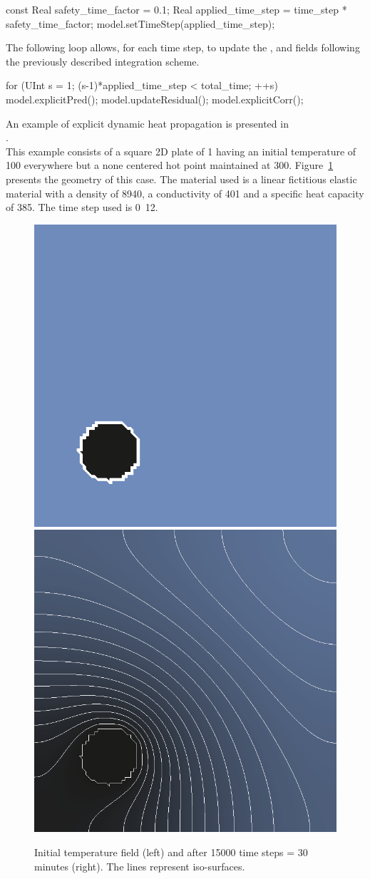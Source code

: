 \begin{cpp}
  const Real safety_time_factor = 0.1;
  Real applied_time_step = time_step * safety_time_factor;
  model.setTimeStep(applied_time_step);
\end{cpp}

The following loop  allows, for each time  step, to update the  ,  and
  fields  following the previously described integration scheme.

\begin{cpp}
  for (UInt s = 1; (s-1)*applied_time_step < total_time; ++s) {
    model.explicitPred();
    model.updateResidual();
    model.explicitCorr();
  }
\end{cpp}

An    example    of    explicit     dynamic    heat propagation is    presented    in \\
.  \\
This example consists of a square 2D plate of \unit{1}{\squaremetre}
having an initial temperature of \unit{100}{\kelvin} everywhere but a
none centered hot point maintained at
\unit{300}{\kelvin}. Figure~\ref{fig:htm:explicit:dynamic} presents
the geometry of this case. The material used is a linear fictitious
elastic material with a density of
\unit{8940}{\kilogrampercubicmetre}, a conductivity of
\unit{401}{\watt\per\metre\per\kelvin} and a specific heat capacity of
\unit{385}{\joule\per\kelvin\per\kilogram}. The time step used is
\unit{0.12}{\second}.

\begin{figure}[!htb]
  \centering
  \includegraphics[width=.4\textwidth]{figures/hot-point-1}
  \hfill
  \includegraphics[width=.4\textwidth]{figures/hot-point-2}
  \caption{Initial temperature field (left) and after 15000 time steps = 30 minutes (right). The lines represent iso-surfaces.}
  \label{fig:htm:explicit:dynamic}
\end{figure}

